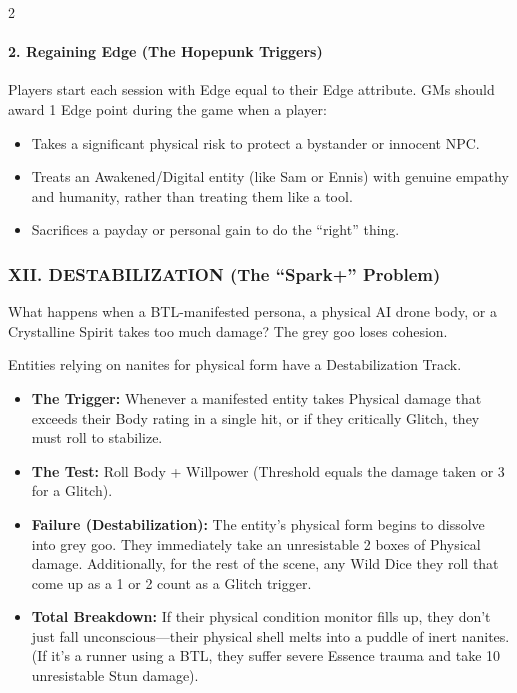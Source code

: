 \documentclass[
  oneside]{article}
\providecommand{\tightlist}{%
  \setlength{\itemsep}{0pt}\setlength{\parskip}{0pt}}
\begin{document}
\begin{multicols}{2}
\hypertarget{regaining-edge-the-hopepunk-triggers}{%
\paragraph{2. Regaining Edge (The Hopepunk
Triggers)}\label{regaining-edge-the-hopepunk-triggers}}

Players start each session with Edge equal to
their Edge attribute. GMs should award 1 Edge
point during the game when a player:

\begin{itemize}
\tightlist
\item
  Takes a significant physical risk to protect a
  bystander or innocent NPC.
\item
  Treats an Awakened/Digital entity (like Sam or
  Ennis) with genuine empathy and humanity, rather
  than treating them like a tool.
\item
  Sacrifices a payday or personal gain to do the
  ``right'' thing.
\end{itemize}

\hypertarget{xii.-destabilization-the-spark-problem}{%
\subsubsection{XII. DESTABILIZATION (The
``Spark+''
Problem)}\label{xii.-destabilization-the-spark-problem}}

What happens when a BTL-manifested persona, a
physical AI drone body, or a Crystalline Spirit
takes too much damage? The grey goo loses
cohesion.

Entities relying on nanites for physical form have
a Destabilization Track.

\begin{itemize}
\tightlist
\item
  \textbf{The Trigger:} Whenever a manifested
  entity takes Physical damage that exceeds their
  Body rating in a single hit, or if they
  critically Glitch, they must roll to stabilize.
\item
  \textbf{The Test:} Roll Body + Willpower
  (Threshold equals the damage taken or 3 for a
  Glitch).
\item
  \textbf{Failure (Destabilization):} The entity's
  physical form begins to dissolve into grey goo.
  They immediately take an unresistable 2 boxes of
  Physical damage. Additionally, for the rest of
  the scene, any Wild Dice they roll that come up
  as a 1 or 2 count as a Glitch trigger.
\item
  \textbf{Total Breakdown:} If their physical
  condition monitor fills up, they don't just fall
  unconscious---their physical shell melts into a
  puddle of inert nanites. (If it's a runner using
  a BTL, they suffer severe Essence trauma and
  take 10 unresistable Stun damage).
\end{itemize}


\end{multicols}
\end{document}
